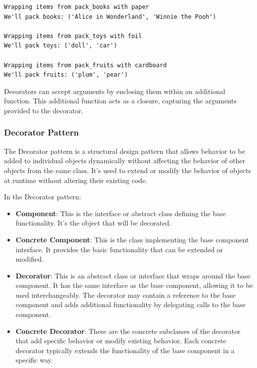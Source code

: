 \begin{verbatim}
Wrapping items from pack_books with paper
We'll pack books: ('Alice in Wonderland', 'Winnie the Pooh')

Wrapping items from pack_toys with foil
We'll pack toys: ('doll', 'car')

Wrapping items from pack_fruits with cardboard
We'll pack fruits: ('plum', 'pear')
\end{verbatim}

Decorators can accept arguments by enclosing them within an additional function. This additional function acts as a closure, capturing the arguments provided to the decorator.

\newpage
\subsubsection{Decorator Pattern}
The Decorator pattern is a structural design pattern that allows behavior to be added to individual objects dynamically without affecting the behavior of other objects from the same class. It's used to extend or modify the behavior of objects at runtime without altering their existing code.

In the Decorator pattern:

\begin{itemize}
    \item \textbf{Component}: This is the interface or abstract class defining the base functionality. It's the object that will be decorated.
    \item \textbf{Concrete Component}: This is the class implementing the base component interface. It provides the basic functionality that can be extended or modified.
    \item \textbf{Decorator}: This is an abstract class or interface that wraps around the base component. It has the same interface as the base component, allowing it to be used interchangeably. The decorator may contain a reference to the base component and adds additional functionality by delegating calls to the base component.
    \item \textbf{Concrete Decorator}: These are the concrete subclasses of the decorator that add specific behavior or modify existing behavior. Each concrete decorator typically extends the functionality of the base component in a specific way.
\end{itemize}


